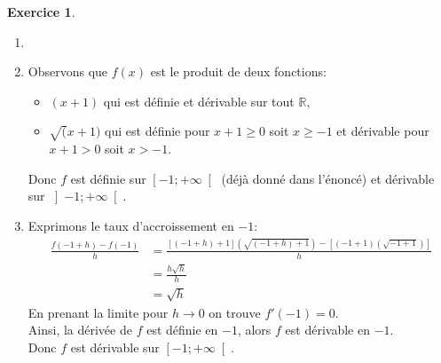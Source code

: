 \documentclass{exam}
\theoremstyle{definition}
\newtheorem{exercice}{Exercice}
\begin{document}
\begin{exercice}
    \begin{enumerate}
        \item[]
        \item Observons que $f(x)$ est le produit de deux fonctions:
        \begin{itemize}
            \item $(x+1)$ qui est définie et dérivable sur tout $\mathbb{R}$,
            \item $\sqrt(x+1)$ qui est définie pour $x + 1 \geq 0$ soit $x \geq -1$ et dérivable pour $x + 1 > 0$ soit $x > -1$.
        \end{itemize}
        Donc $f$ est définie sur $\left[-1; +\infty\right[$ (déjà donné dans l'énoncé) et dérivable sur $\left]-1; +\infty\right[$.
        \item Exprimons le taux d'accroissement en $-1$:
        \begin{align*}
            \frac{f(-1+h) - f(-1)}{h} &= \frac{\left[(-1+h)+1\right]\left(\sqrt{(-1 + h) + 1}\right) - \left[(-1 + 1)(\sqrt{-1 + 1})\right]}{h}\\
            &= \frac{h\sqrt{h}}{h}\\
            &= \sqrt{h}
        \end{align*}
        En prenant la limite pour $h \rightarrow 0$ on trouve $f'(-1) = 0$.\\
        Ainsi, la dérivée de $f$ est définie en $-1$, alors $f$ est dérivable en $-1$.\\
        Donc $f$ est dérivable sur $\left[-1; +\infty\right[$.
    \end{enumerate}
\end{exercice}
\end{document}
